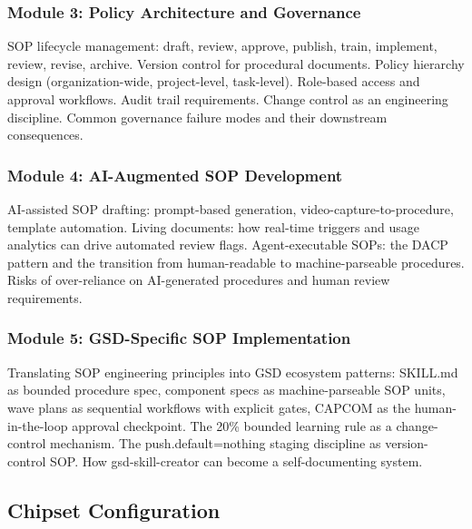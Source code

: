 \documentclass[11pt,letterpaper]{article}
\begin{document}
\subsubsection{Module 3: Policy Architecture and Governance}
SOP lifecycle management: draft, review, approve, publish, train, implement, review, revise, archive. Version control for procedural documents. Policy hierarchy design (organization-wide, project-level, task-level). Role-based access and approval workflows. Audit trail requirements. Change control as an engineering discipline. Common governance failure modes and their downstream consequences.

\subsubsection{Module 4: AI-Augmented SOP Development}
AI-assisted SOP drafting: prompt-based generation, video-capture-to-procedure, template automation. Living documents: how real-time triggers and usage analytics can drive automated review flags. Agent-executable SOPs: the DACP pattern and the transition from human-readable to machine-parseable procedures. Risks of over-reliance on AI-generated procedures and human review requirements.

\subsubsection{Module 5: GSD-Specific SOP Implementation}
Translating SOP engineering principles into GSD ecosystem patterns: SKILL.md as bounded procedure spec, component specs as machine-parseable SOP units, wave plans as sequential workflows with explicit gates, CAPCOM as the human-in-the-loop approval checkpoint. The 20\% bounded learning rule as a change-control mechanism. The push.default=nothing staging discipline as version-control SOP. How gsd-skill-creator can become a self-documenting system.

\subsection{Chipset Configuration}
\end{document}

